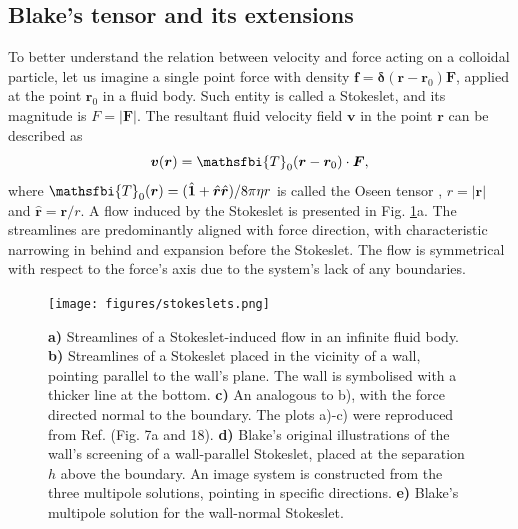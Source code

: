 \documentclass{master_thesis}
\begin{document}
\subsection{Blake's tensor and its extensions}

To better understand the relation between velocity and force acting on a colloidal particle, let us imagine a single point force with density $\boldsymbol{f} = \bm{\delta}(\boldsymbol{r} - \boldsymbol{r}_0) \boldsymbol{F}$, applied at the point $\boldsymbol{r}_0$ in a fluid body. Such entity is called a Stokeslet, and its magnitude is $F=|\boldsymbol{F}|$. The resultant fluid velocity field $\boldsymbol{v}$ in the point $\boldsymbol{r}$ can be described as
\begin{equation}
    \boldsymbol{v}(\boldsymbol{r}) = \mathsfbi{T}_0(\boldsymbol{r} - \boldsymbol{r}_0) \cdot \boldsymbol{F},
\label{eqn:stokeslet_velocity}
\end{equation}
where $\mathsfbi{T}_0(\boldsymbol{r}) = (\hat{\bm{1}} + \hat{\boldsymbol{r}}\hat{\boldsymbol{r}}) / 8 \pi \eta r$ is called the Oseen tensor \cite{kim_karilla}, $r = |\boldsymbol{r}|$ and $\hat{\boldsymbol{r}}=\boldsymbol{r}/r$. A flow induced by the Stokeslet is presented in Fig. \ref{fig:stokeslets}a. The streamlines are predominantly aligned with force direction, with characteristic narrowing in behind and expansion before the Stokeslet. The flow is symmetrical with respect to the force's axis due to the system's lack of any boundaries.

\begin{figure}
    \centering
    \texttt{[image: figures/stokeslets.png]}
    \caption{ \textbf{a)} Streamlines of a Stokeslet-induced flow in an infinite fluid body. \textbf{b)} Streamlines of a Stokeslet placed in the vicinity of a wall, pointing parallel to the wall's plane. The wall is symbolised with a thicker line at the bottom. \textbf{c)} An analogous to b), with the force directed normal to the boundary. The plots a)-c) were reproduced from Ref. \cite{lisicki_nagele_2016} (Fig. 7a and 18). \textbf{d)} Blake's original illustrations of the wall's screening of a wall-parallel Stokeslet, placed at the separation $h$ above the boundary. An image system is constructed from the three multipole solutions, pointing in specific directions. \textbf{e)} Blake's multipole solution for the wall-normal Stokeslet.}
    \label{fig:stokeslets}
\end{figure}
\end{document}
